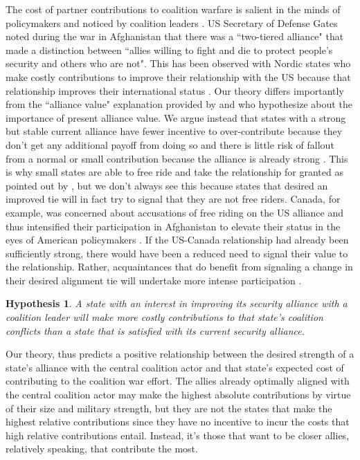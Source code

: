 \documentclass[12pt,letterpaper]{article}
\newtheorem{hyp}{Hypothesis}
\begin{document}
		The cost of partner contributions to coalition warfare is salient in the minds of policymakers and noticed by coalition leaders \citep[328]{ringsmose_natoburdensharingredux_2010}. US Secretary of Defense Gates noted during the war in Afghanistan that there was a ``two-tiered alliance" that made a distinction between ``allies willing to fight and die to protect people's security and others who are not". This has been observed with Nordic states who make costly contributions to improve their relationship with the US because that relationship improves their international status \citep{pedersen_bandwagonstatuschanging_2018}. Our theory differs importantly from the ``alliance value" explanation provided by \citet{davidson_americaallieswar_2011} and \citet{massie_democraticalliesfollowership_2016} who hypothesize about the importance of present alliance value. We argue instead that states with a strong but stable current alliance have fewer incentive to over-contribute because they don't get any additional payoff from doing so and there is little risk of fallout from a normal or small contribution because the alliance is already strong \citep{davidson_headingexitsdemocratic_2014}. This is why small states are able to free ride and take the relationship for granted as pointed out by \citet{keohane_biginfluencesmall_1971}, but we don't always see this because states that desired an improved tie will in fact try to signal that they are not free riders. Canada, for example, was concerned about accusations of free riding on the US alliance and thus intensified their participation in Afghanistan to elevate their status in the eyes of American policymakers \citep{massie_alliancevaluestatus_2018}. If the US-Canada relationship had already been sufficiently strong, there would have been a reduced need to signal their value to the relationship. Rather, acquaintances that do benefit from signaling a change in their desired alignment tie will undertake more intense participation \citep{gibler_priorcommitmentscompatible_2004, gartzke_contractsfriendsalliances_2012}.

		\begin{hyp}
			A state with an interest in improving its security alliance with a coalition leader will make more costly contributions to that state's coalition conflicts than a state that is satisfied with its current security alliance.
		\end{hyp}

		Our theory, thus predicts a positive relationship between the desired strength of a state's alliance with the central coalition actor and that state's expected cost of contributing to the coalition war effort. The allies already optimally aligned with the central coalition actor may make the highest absolute contributions by virtue of their size and military strength, but they are not the states that make the highest relative contributions since they have no incentive to incur the costs that high relative contributions entail. Instead, it's those that want to be closer allies, relatively speaking, that contribute the most.
\end{document}
